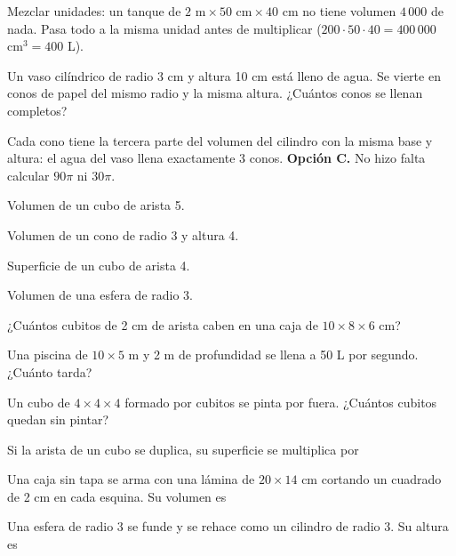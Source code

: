 \begin{trampa}
Mezclar unidades: un tanque de $2 \text{ m} \times 50 \text{ cm} \times 40 \text{ cm}$ no tiene volumen $4\,000$ de nada.
Pasa todo a la misma unidad antes de multiplicar ($200 \cdot 50 \cdot 40 = 400\,000$ cm$^3 = 400$ L).
\end{trampa}

\begin{reto}
Un vaso cilíndrico de radio 3 cm y altura 10 cm está lleno de agua. Se vierte en conos de papel del mismo radio y la misma
altura. ¿Cuántos conos se llenan completos?
\end{reto}

\begin{retoresuelto}
Cada cono tiene la tercera parte del volumen del cilindro con la misma base y altura: el agua del vaso llena exactamente
3 conos. \textbf{Opción C.} No hizo falta calcular $90\pi$ ni $30\pi$.
\end{retoresuelto}

\taller
{}
\begin{ejercicios}[2]
\item Volumen de un cubo de arista 5. 
\item Volumen de un cono de radio 3 y altura 4. 
\item Superficie de un cubo de arista 4. 
\item Volumen de una esfera de radio 3. 
\end{ejercicios}
\begin{ejercicios}
\item ¿Cuántos cubitos de 2 cm de arista caben en una caja de $10 \times 8 \times 6$ cm? 
\item Una piscina de $10 \times 5$ m y 2 m de profundidad se llena a 50 L por segundo. ¿Cuánto tarda? 
\item Un cubo de $4 \times 4 \times 4$ formado por cubitos se pinta por fuera. ¿Cuántos cubitos quedan sin pintar? 
\end{ejercicios}
\begin{ejercicios}
\item Si la arista de un cubo se duplica, su superficie se multiplica por
\item Una caja sin tapa se arma con una lámina de $20 \times 14$ cm cortando un cuadrado de 2 cm en cada esquina. Su volumen es
\item Una esfera de radio 3 se funde y se rehace como un cilindro de radio 3. Su altura es
\end{ejercicios}

